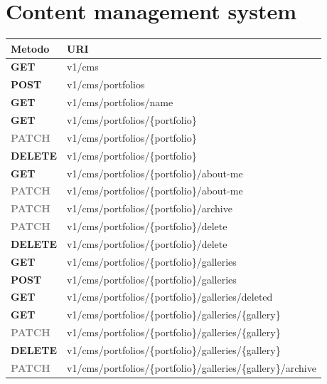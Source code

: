 \section{Content management system}
\begin{table}[h]
	\begin{tabularx}{\textwidth}{l X}
		\hline
		\textbf{Metodo} & \textbf{URI} \\
		\hline
\textcolor{get}{\textbf{GET}}   &     v1/cms  \\
		  \textcolor{post}{\textbf{POST}}  &          v1/cms/portfolios   \\
		  \textcolor{get}{\textbf{GET}}     &   v1/cms/portfolios/name  \\
		  \textcolor{get}{\textbf{GET}}     &   v1/cms/portfolios/\{portfolio\}  \\
		  \textcolor{gray}{\textbf{PATCH}}  &     v1/cms/portfolios/\{portfolio\}  \\
		  \textcolor{delete}{\textbf{DELETE}}&          v1/cms/portfolios/\{portfolio\}    \\
		  \textcolor{get}{\textbf{GET}}      & v1/cms/portfolios/\{portfolio\}/about-me  \\
		  \textcolor{gray}{\textbf{PATCH}}   &        v1/cms/portfolios/\{portfolio\}/about-me   \\
		\textcolor{gray}{\textbf{PATCH}}    &       v1/cms/portfolios/\{portfolio\}/archive  \\
		  \textcolor{gray}{\textbf{PATCH}}    &       v1/cms/portfolios/\{portfolio\}/delete  \\
		  \textcolor{delete}{\textbf{DELETE}}  &        v1/cms/portfolios/\{portfolio\}/delete  \\
		  \textcolor{get}{\textbf{GET}}   &     v1/cms/portfolios/\{portfolio\}/galleries  \\
		  \textcolor{post}{\textbf{POST}}  &          v1/cms/portfolios/\{portfolio\}/galleries    \\
		  \textcolor{get}{\textbf{GET}}    &    v1/cms/portfolios/\{portfolio\}/galleries/deleted  \\
		  \textcolor{get}{\textbf{GET}}    &    v1/cms/portfolios/\{portfolio\}/galleries/\{gallery\}  \\
		  \textcolor{gray}{\textbf{PATCH}}    &   v1/cms/portfolios/\{portfolio\}/galleries/\{gallery\}   \\
		  \textcolor{delete}{\textbf{DELETE}}  &       v1/cms/portfolios/\{portfolio\}/galleries/\{gallery\}   \\
		  \textcolor{gray}{\textbf{PATCH}}     &      v1/cms/portfolios/\{portfolio\}/galleries/\{gallery\}/archive  \\

\end{tabularx}
\end{table}
